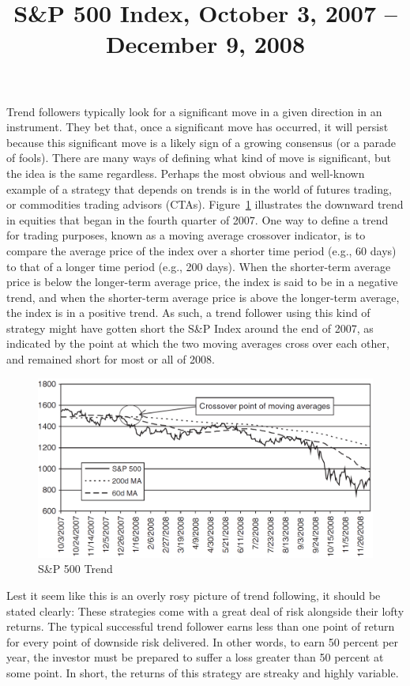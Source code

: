 \documentclass[11pt]{report}
\begin{document}
					Trend followers typically look for a significant move in a given direction in an instrument. They bet that, once a significant move has occurred, it will persist because this significant move is a likely sign of a growing consensus (or a parade of fools). There are many ways of defining what kind of move is significant, but the idea is the same regardless. Perhaps the most obvious and well-known example of a strategy that depends on trends is in the world of futures trading, or commodities trading advisors (CTAs). Figure~\ref{fig:MAtrend} illustrates the downward trend in equities that began in the fourth quarter of 2007. One way to define a trend for trading purposes, known as a moving average crossover indicator, is to compare the average price of the index over a shorter time period (e.g., 60 days) to that of a longer time period (e.g., 200 days). When the shorter-term average price is below the longer-term average price, the index is said to be in a negative trend, and when the shorter-term average price is above the longer-term average, the index is in a positive trend. As such, a trend follower using this kind of strategy might have gotten short the S\&P Index around the end of 2007, as indicated by the point at which the two moving averages cross over each other, and remained short for most or all of 2008.

					\begin{figure}[htbp]
						\centering
						\title{S\&P 500 Index, October 3, 2007 -- December 9, 2008}
						\includegraphics[width=.9\textwidth]{MAtrend.png}
						\caption{S\&P 500 Trend}
						\label{fig:MAtrend}
					\end{figure}

					Lest it seem like this is an overly rosy picture of trend following, it should be stated clearly: These strategies come with a great deal of risk alongside their lofty returns. The typical successful trend follower earns less than one point of return for every point of downside risk delivered. In other words, to earn 50 percent per year, the investor must be prepared to suffer a loss greater than 50 percent at some point. In short, the returns of this strategy are streaky and highly variable.
\end{document}
